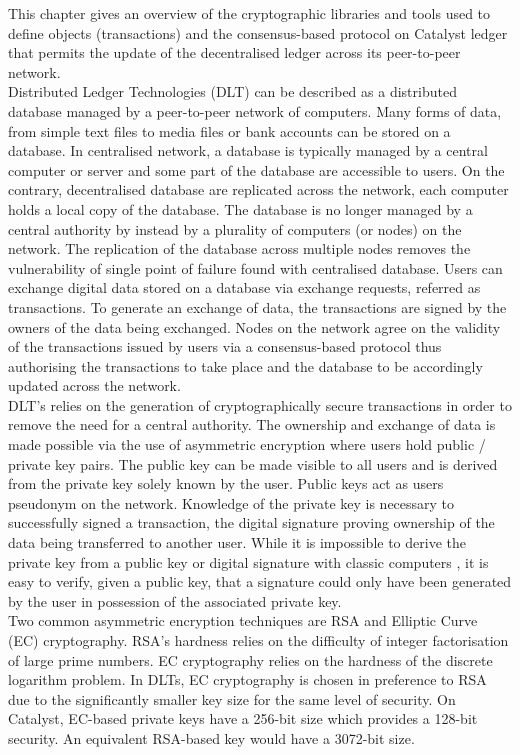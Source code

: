 This chapter gives an overview of the cryptographic libraries and tools used to define objects (transactions) and the consensus-based protocol on Catalyst ledger that permits the update of the decentralised ledger across its peer-to-peer network. \\

Distributed Ledger Technologies (DLT) can be described as a distributed database managed by a peer-to-peer network of computers. Many forms of data, from simple text files to media files or bank accounts can be stored on a database. In centralised network, a database is typically managed by a central computer or server and some part of the database are accessible to users. On the contrary, decentralised database are replicated across the network, each computer holds a local copy of the database. The database is no longer managed by a central authority by instead by a plurality of computers (or nodes) on the network. The replication of the database across multiple nodes removes the vulnerability of single point of failure found with centralised database. Users can exchange digital data stored on a database via exchange requests, referred as transactions. To generate an exchange of data, the transactions are signed by the owners of the data being exchanged. Nodes on the network agree on the validity of the transactions issued by users via a consensus-based protocol thus authorising the transactions to take place and the database to be accordingly updated across the network. \\

DLT's relies on the generation of cryptographically secure transactions in order to remove the need for a central authority. The ownership and exchange of data is made possible via the use of asymmetric encryption where users hold public / private key pairs. The public key can be made visible to all users and is derived from the private key solely known by the user. Public keys act as users pseudonym on the network. Knowledge of the private key is necessary to successfully signed a transaction, the digital signature proving ownership of the data being transferred to another user. While it is impossible to derive the private key from a public key or digital signature with classic computers , it is easy to verify, given a public key, that a signature could only have been generated by the user in possession of the associated private key. \\

Two common asymmetric encryption techniques are RSA and Elliptic Curve (EC) cryptography. RSA's hardness relies on the difficulty of integer factorisation of large prime numbers.  EC cryptography relies on the hardness of the discrete logarithm problem. In DLTs, EC cryptography is chosen in preference to RSA due to the significantly smaller key size for the same level of security. On Catalyst, EC-based private keys have a 256-bit size which provides a 128-bit security. An equivalent RSA-based key would have a 3072-bit size.

